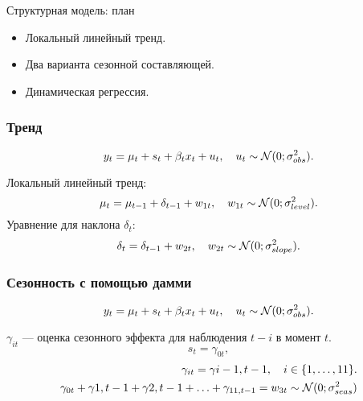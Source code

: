 
\begin{frame} %

    
    \end{frame}
    


    \begin{frame}{Структурная модель: план}
        \begin{itemize}[<+->]
          \item \alert{Локальный линейный} тренд. 
          \item Два варианта \alert{сезонной} составляющей.
          \item \alert{Динамическая регрессия}. 
        \end{itemize}
      
      \end{frame}
      
      

\begin{frame}
    \frametitle{Тренд}
    \[
    y_t = \mu_t + s_t + \beta_t x_t +  u_t, \quad u_t \sim \mathcal{N}(0; \sigma^2_{obs}).  
    \]
  
    \pause
    \alert{Локальный линейный тренд}:
    \[
       \mu_t = \mu_{t-1} + \delta_{t-1} + w_{1t}, \quad w_{1t} \sim \mathcal{N}(0; \sigma^2_{level}).
    \]
    \pause
    Уравнение для наклона $\delta_t$:
    \[
      \delta_{t} = \delta_{t-1} +  w_{2t}, \quad w_{2t} \sim \mathcal{N}(0; \sigma^2_{slope}).
    \]
    
  \end{frame}
  
  \begin{frame}
    \frametitle{Сезонность с помощью дамми}
    \[
    y_t = \mu_t + s_t + \beta_t x_t +  u_t, \quad u_t \sim \mathcal{N}(0; \sigma^2_{obs}).  
    \]
  
    \pause
    $\gamma_{it}$ — оценка сезонного эффекта для наблюдения $t-i$ в момент $t$. 
    \[
    s_t = \gamma_{0t},  
    \]
    \pause
    \begin{eqnarray*}
      \gamma_{it} = \gamma{i-1,t-1}, \quad i \in \{1, \ldots, 11\}.  \\
      \gamma_{0t} + \gamma{1,t-1} + \gamma{2,t-1} + \ldots + \gamma_{11,t-1} = w_{3t} \sim \mathcal{N}(0;\sigma^2_{seas})
    \end{eqnarray*}
  \end{frame}
  
